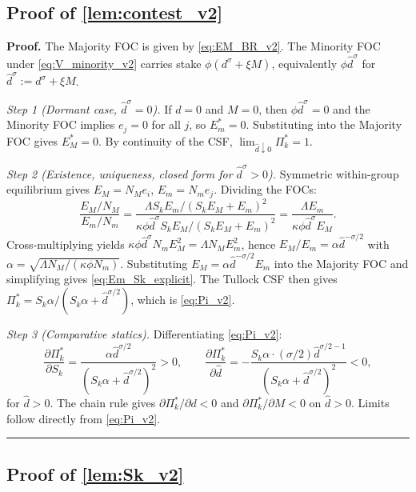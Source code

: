 \documentclass[11pt,twoside]{extarticle}
\newenvironment{proof}[1][Proof]{\noindent \textbf{#1.} }{\ \rule{0.5em}{0.5em}}
\begin{document}
\subsection*{Proof of \autoref{lem:contest_v2}} \label{app:proof:contest_v2}

\begin{proof}
The Majority FOC is given by \autoref{eq:EM_BR_v2}. The Minority FOC
under \autoref{eq:V_minority_v2} carries stake $\phi(d^\sigma + \xi M)$,
equivalently $\phi\hat d^\sigma$ for $\hat d^\sigma := d^\sigma + \xi M$.

\textit{Step 1 (Dormant case, $\hat d^\sigma = 0$).} If $d = 0$ and $M = 0$,
then $\phi\hat d^\sigma = 0$ and the Minority FOC implies $e_j = 0$ for all
$j$, so $E_m^* = 0$. Substituting into the Majority FOC gives $E_M^* = 0$.
By continuity of the CSF, $\lim_{\hat d \downarrow 0} \Pi_k^* = 1$.

\textit{Step 2 (Existence, uniqueness, closed form for $\hat d^\sigma > 0$).}
Symmetric within-group equilibrium gives $E_M = N_M e_i$, $E_m = N_m e_j$.
Dividing the FOCs:
\[
\frac{E_M / N_M}{E_m / N_m}
= \frac{\Lambda S_k E_m / (S_k E_M + E_m)^2}{\kappa\phi\hat d^\sigma S_k E_M / (S_k E_M + E_m)^2}
= \frac{\Lambda E_m}{\kappa\phi\hat d^\sigma E_M}.
\]
Cross-multiplying yields $\kappa\phi\hat d^\sigma N_m E_M^2 = \Lambda N_M E_m^2$, hence
$E_M / E_m = \alpha\hat d^{-\sigma/2}$ with $\alpha = \sqrt{\Lambda N_M / (\kappa\phi N_m)}$.
Substituting $E_M = \alpha\hat d^{-\sigma/2} E_m$ into the Majority FOC and
simplifying gives \autoref{eq:Em_Sk_explicit}. The Tullock CSF then gives
$\Pi_k^* = S_k\alpha / (S_k\alpha + \hat d^{\sigma/2})$, which is
\autoref{eq:Pi_v2}.

\textit{Step 3 (Comparative statics).} Differentiating \autoref{eq:Pi_v2}:
\[
\frac{\partial\Pi_k^*}{\partial S_k} = \frac{\alpha\hat d^{\sigma/2}}{(S_k\alpha + \hat d^{\sigma/2})^2} > 0,
\qquad
\frac{\partial\Pi_k^*}{\partial \hat d} = -\frac{S_k\alpha \cdot (\sigma/2)\hat d^{\sigma/2 - 1}}{(S_k\alpha + \hat d^{\sigma/2})^2} < 0,
\]
for $\hat d > 0$. The chain rule gives $\partial\Pi_k^* / \partial d < 0$
and $\partial\Pi_k^* / \partial M < 0$ on $\hat d > 0$. Limits follow
directly from \autoref{eq:Pi_v2}.
\end{proof}

\subsection*{Proof of \autoref{lem:Sk_v2}} \label{app:proof:Sk_v2}
\end{document}
